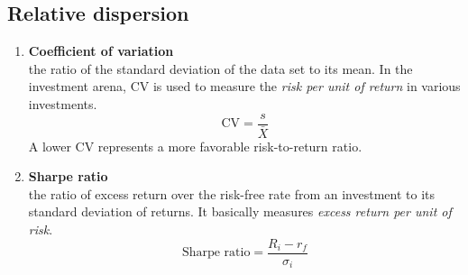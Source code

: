 \subsection{Relative dispersion}
	\label{subsec:Relative dispersion}
\begin{enumerate}
	\item \textbf{Coefficient of variation}\\
	      the ratio of the standard deviation of the data set to its mean.
	      In the investment arena, CV is used to measure the \textit{risk per unit of return} in various investments.
		\begin{equation}
			\text{CV} = \frac{s}{\bar{X}}
			\label{eq:coefficient_of_variation_m5}
		\end{equation}
A lower CV represents a more favorable risk-to-return ratio.
	\item \textbf{Sharpe ratio}\\
	      the ratio of excess return over the risk-free rate from an investment to its standard deviation of returns.
	      It basically measures \textit{excess return per unit of risk}.
		  \begin{equation}
			\text{Sharpe ratio} = \frac{R_i - r_f}{\sigma_i}
			\label{eq:Sharpe_m5}
		\end{equation}
\end{enumerate}

